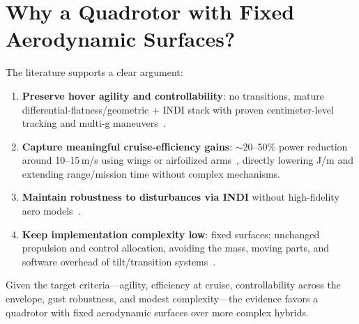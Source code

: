 \section{Why a Quadrotor with Fixed Aerodynamic Surfaces?}

The literature supports a clear argument:
\begin{enumerate}
  \item \textbf{Preserve hover agility and controllability}: no transitions, mature differential-flatness/geometric + INDI stack with proven centimeter-level tracking and multi-g maneuvers~\cite{Lee2010,Tal2018,Foehn2022}.
  \item \textbf{Capture meaningful cruise-efficiency gains}: $\sim$20--50\% power reduction around 10--15\,m/s using wings or airfoilized arms~\cite{Dawkins2018,Xiao2020,Freitas2025}, directly lowering J/m and extending range/mission time without complex mechanisms.
  \item \textbf{Maintain robustness to disturbances via INDI} without high-fidelity aero models~\cite{Sieberling2010,Smeur2017,Sun2021}.
  \item \textbf{Keep implementation complexity low}: fixed surfaces; unchanged propulsion and control allocation, avoiding the mass, moving parts, and software overhead of tilt/transition systems~\cite{Misra2022,Okulski2022}.
\end{enumerate}
Given the target criteria---agility, efficiency at cruise, controllability across the envelope, gust robustness, and modest complexity---the evidence favors a quadrotor with fixed aerodynamic surfaces over more complex hybrids.
